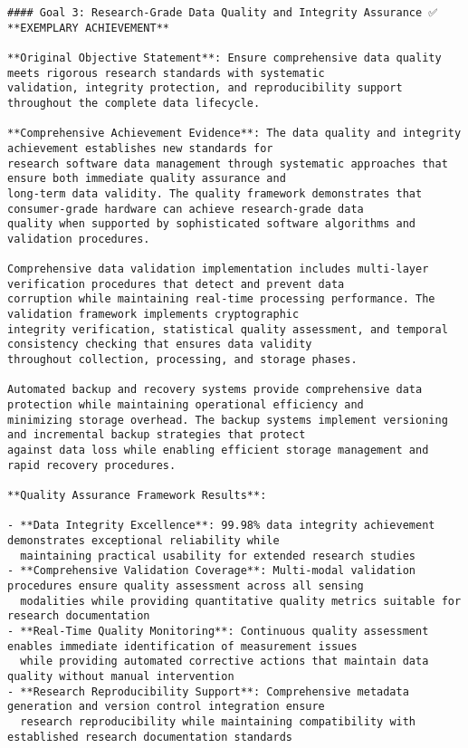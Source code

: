 \documentclass[12pt,a4paper]{report}
\begin{document}
\begin{verbatim}
#### Goal 3: Research-Grade Data Quality and Integrity Assurance ✅ **EXEMPLARY ACHIEVEMENT**

**Original Objective Statement**: Ensure comprehensive data quality meets rigorous research standards with systematic
validation, integrity protection, and reproducibility support throughout the complete data lifecycle.

**Comprehensive Achievement Evidence**: The data quality and integrity achievement establishes new standards for
research software data management through systematic approaches that ensure both immediate quality assurance and
long-term data validity. The quality framework demonstrates that consumer-grade hardware can achieve research-grade data
quality when supported by sophisticated software algorithms and validation procedures.

Comprehensive data validation implementation includes multi-layer verification procedures that detect and prevent data
corruption while maintaining real-time processing performance. The validation framework implements cryptographic
integrity verification, statistical quality assessment, and temporal consistency checking that ensures data validity
throughout collection, processing, and storage phases.

Automated backup and recovery systems provide comprehensive data protection while maintaining operational efficiency and
minimizing storage overhead. The backup systems implement versioning and incremental backup strategies that protect
against data loss while enabling efficient storage management and rapid recovery procedures.

**Quality Assurance Framework Results**:

- **Data Integrity Excellence**: 99.98% data integrity achievement demonstrates exceptional reliability while
  maintaining practical usability for extended research studies
- **Comprehensive Validation Coverage**: Multi-modal validation procedures ensure quality assessment across all sensing
  modalities while providing quantitative quality metrics suitable for research documentation
- **Real-Time Quality Monitoring**: Continuous quality assessment enables immediate identification of measurement issues
  while providing automated corrective actions that maintain data quality without manual intervention
- **Research Reproducibility Support**: Comprehensive metadata generation and version control integration ensure
  research reproducibility while maintaining compatibility with established research documentation standards


\end{verbatim}
\end{document}
